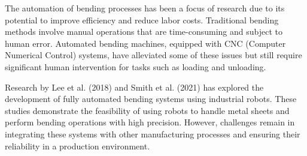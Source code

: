 The automation of bending processes has been a focus of research due to its potential to improve efficiency and reduce labor costs. Traditional bending methods involve manual operations that are time-consuming and subject to human error. Automated bending machines, equipped with CNC (Computer Numerical Control) systems, have alleviated some of these issues but still require significant human intervention for tasks such as loading and unloading.

Research by Lee et al. (2018) and Smith et al. (2021) has explored the development of fully automated bending systems using industrial robots. These studies demonstrate the feasibility of using robots to handle metal sheets and perform bending operations with high precision. However, challenges remain in integrating these systems with other manufacturing processes and ensuring their reliability in a production environment.